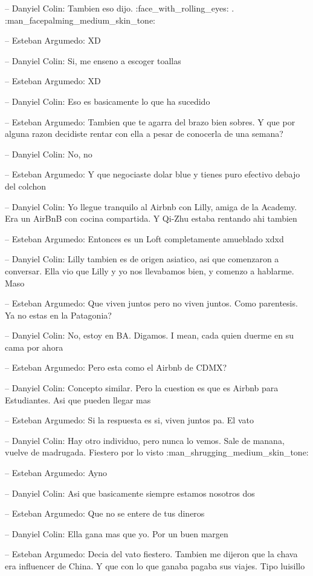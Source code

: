 -- Danyiel Colin: Tambien eso dijo. :face\_with\_rolling\_eyes: .
:man\_facepalming\_medium\_skin\_tone:

-- Esteban Argumedo: XD

-- Danyiel Colin: Si, me enseno a escoger toallas

-- Esteban Argumedo: XD

-- Danyiel Colin: Eso es basicamente lo que ha sucedido

-- Esteban Argumedo: Tambien que te agarra del brazo bien sobres. Y que
por alguna razon decidiste rentar con ella a pesar de conocerla de una
semana?

-- Danyiel Colin: No, no

-- Esteban Argumedo: Y que negociaste dolar blue y tienes puro efectivo
debajo del colchon

-- Danyiel Colin: Yo llegue tranquilo al Airbnb con Lilly, amiga de la
Academy. Era un AirBnB con cocina compartida. Y Qi-Zhu estaba rentando
ahi tambien

-- Esteban Argumedo: Entonces es un Loft completamente amueblado xdxd

-- Danyiel Colin: Lilly tambien es de origen asiatico, asi que
comenzaron a conversar. Ella vio que Lilly y yo nos llevabamos bien, y
comenzo a hablarme. Maso

-- Esteban Argumedo: Que viven juntos pero no viven juntos. Como
parentesis. Ya no estas en la Patagonia?

-- Danyiel Colin: No, estoy en BA. Digamos. I mean, cada quien duerme en
su cama por ahora

-- Esteban Argumedo: Pero esta como el Airbnb de CDMX?

-- Danyiel Colin: Concepto similar. Pero la cuestion es que es Airbnb
para Estudiantes. Asi que pueden llegar mas

-- Esteban Argumedo: Si la respuesta es si, viven juntos pa. El vato

-- Danyiel Colin: Hay otro individuo, pero nunca lo vemos. Sale de
manana, vuelve de madrugada. Fiestero por lo visto
:man\_shrugging\_medium\_skin\_tone:

-- Esteban Argumedo: Ayno

-- Danyiel Colin: Asi que basicamente siempre estamos nosotros dos

-- Esteban Argumedo: Que no se entere de tus dineros

-- Danyiel Colin: Ella gana mas que yo. Por un buen margen

-- Esteban Argumedo: Decia del vato fiestero. Tambien me dijeron que la
chava era influencer de China. Y que con lo que ganaba pagaba sus
viajes. Tipo luisillo

